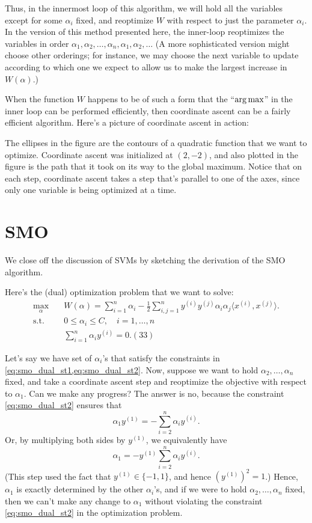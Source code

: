 Thus, in the innermost loop of this algorithm, we will hold all the variables
except for some $\alpha_i$ fixed, and reoptimize $W$ with respect to just the parameter
$\alpha_i$. In the version of this method presented here, the inner-loop reoptimizes
the variables in order $\alpha_1 ,\alpha_2 ,\ldots ,\alpha_n ,\alpha_1 ,\alpha_2 ,\ldots$  (A more sophisticated version
might choose other orderings; for instance, we may choose the next variable
to update according to which one we expect to allow us to make the largest
increase in $W(\alpha)$.)

When the function $W$ happens to be of such a form that the ``$\argmax$''
in the inner loop can be performed efficiently, then coordinate ascent can be
a fairly efficient algorithm. Here's a picture of coordinate ascent in action:

The ellipses in the figure are the contours of a quadratic function that
we want to optimize. Coordinate ascent was initialized at $(2,-2)$, and also
plotted in the figure is the path that it took on its way to the global maximum.
Notice that on each step, coordinate ascent takes a step that's parallel to one
of the axes, since only one variable is being optimized at a time.

\section{SMO}
We close off the discussion of SVMs by sketching the derivation of the SMO
algorithm.

Here's the (dual) optimization problem that we want to solve:
\begin{align}
    \max_\alpha \quad& W(\alpha) = \sum_{i=1}^n \alpha_i - \frac{1}{2} \sum_{i,j=1}^n y^{(i)} y^{(j)} \alpha_i \alpha_j \langle x^{(i)} ,x^{(j)} \rangle\label{eq:smo_dual_max}.\\
    \operatorname{s.t.} \quad& 0 \le \alpha_i \le C, \quad i = 1,\ldots,n\label{eq:smo_dual_st1}\\
    \quad& \sum_{i=1}^n \alpha_i y^{(i)} = 0\label{eq:smo_dual_st2}. (33)
\end{align}

Let's say we have set of $\alpha_i$'s that satisfy the constraints in \cref{eq:smo_dual_st1,eq:smo_dual_st2}. Now,
suppose we want to hold $\alpha_2 ,\ldots,\alpha_n$ fixed, and take a coordinate ascent step
and reoptimize the objective with respect to $\alpha_1$. Can we make any progress?
The answer is no, because the constraint \ref{eq:smo_dual_st2} ensures that
\begin{equation*}
    \alpha_1 y^{(1)} = -\sum_{i=2}^n \alpha_i y^{(i)}.
\end{equation*}
Or, by multiplying both sides by $y^{(1)}$, we equivalently have
\begin{equation*}
    \alpha_1 = -y^{(1)} \sum_{i=2}^n \alpha_i y^{(i)}.
\end{equation*}
(This step used the fact that $y^{(1)} \in \{-1,1\}$, and hence $(y^{(1)})^2 = 1$.) Hence,
$\alpha_1$ is exactly determined by the other $\alpha_i$'s, and if we were to hold $\alpha_2 ,\ldots,\alpha_n$
fixed, then we can't make any change to $\alpha_1$ without violating the constraint \ref{eq:smo_dual_st2} in the optimization problem.

